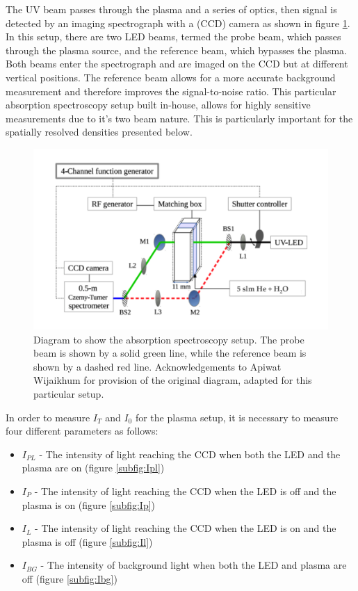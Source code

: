 \documentclass[11pt, oneside]{article}   	%
\begin{document}
The UV beam passes through the plasma and a series of optics, then signal is detected by an imaging spectrograph with a (CCD) camera as shown in figure \ref{fig:Setup}. 
In this setup, there are two LED beams, termed the probe beam, which passes through the plasma source, and the reference beam, which bypasses the plasma.
Both beams enter the spectrograph and are imaged on the CCD but at different vertical positions.
The reference beam allows for a more accurate background measurement and therefore improves the signal-to-noise ratio.
This particular absorption spectroscopy setup built in-house, allows for highly sensitive measurements due to it's two beam nature.
This is particularly important for the spatially resolved densities presented below.

\begin{figure}
	\includegraphics[width=\textwidth]{Figures/SetupfromApiwat}
	\caption{Diagram to show the absorption spectroscopy setup. The probe beam is shown by a solid green line, while the reference beam is shown by a dashed red line. Acknowledgements to Apiwat Wijaikhum for provision of the original diagram, adapted for this particular setup.}
	\label{fig:Setup}
\end{figure} 


In order to measure $I_T$ and $I_0$ for the plasma setup, it is necessary to measure four different parameters as follows:
\begin{itemize}
    \item $I_{PL}$ - The intensity of light reaching the CCD when both the LED and the plasma are on (figure \ref{subfig:Ipl})
    \item $I_{P}$ - The intensity of light reaching the CCD when the LED is off and the plasma is on (figure \ref{subfig:Ip})
    \item $I_L$ - The intensity of light reaching the CCD when the LED is on and the plasma is off (figure \ref{subfig:Il})
    \item $I_{BG}$ - The intensity of background light when both the LED and plasma are off (figure \ref{subfig:Ibg})
\end{itemize}
\end{document}

